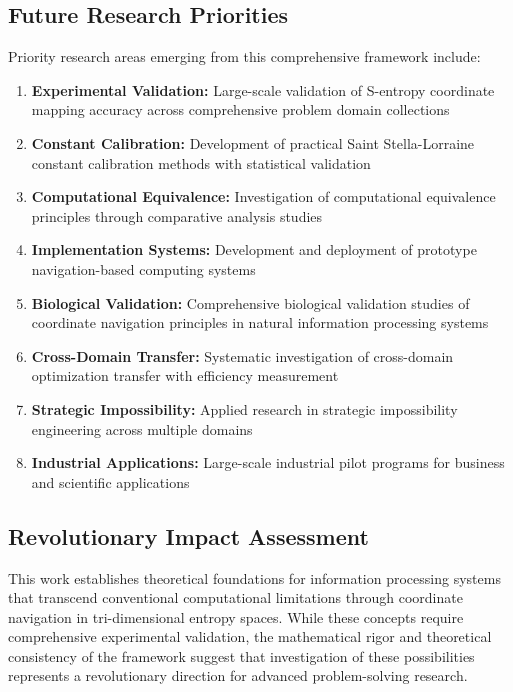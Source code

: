 \documentclass[11pt]{article}
\theoremstyle{definition}
\theoremstyle{remark}
\begin{document}
\subsection{Future Research Priorities}

Priority research areas emerging from this comprehensive framework include:

\begin{enumerate}
\item \textbf{Experimental Validation:} Large-scale validation of S-entropy coordinate mapping accuracy across comprehensive problem domain collections
\item \textbf{Constant Calibration:} Development of practical Saint Stella-Lorraine constant calibration methods with statistical validation
\item \textbf{Computational Equivalence:} Investigation of computational equivalence principles through comparative analysis studies
\item \textbf{Implementation Systems:} Development and deployment of prototype navigation-based computing systems
\item \textbf{Biological Validation:} Comprehensive biological validation studies of coordinate navigation principles in natural information processing systems
\item \textbf{Cross-Domain Transfer:} Systematic investigation of cross-domain optimization transfer with efficiency measurement
\item \textbf{Strategic Impossibility:} Applied research in strategic impossibility engineering across multiple domains
\item \textbf{Industrial Applications:} Large-scale industrial pilot programs for business and scientific applications
\end{enumerate}

\subsection{Revolutionary Impact Assessment}

This work establishes theoretical foundations for information processing systems that transcend conventional computational limitations through coordinate navigation in tri-dimensional entropy spaces. While these concepts require comprehensive experimental validation, the mathematical rigor and theoretical consistency of the framework suggest that investigation of these possibilities represents a revolutionary direction for advanced problem-solving research.
\end{document}
